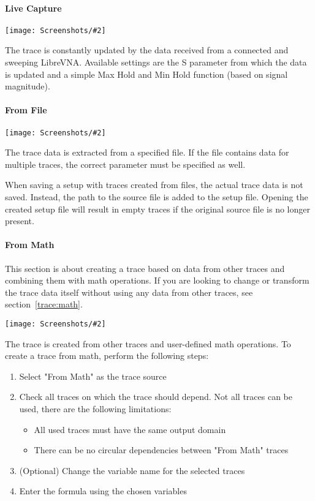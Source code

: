 \documentclass[a4paper,11pt]{article}
\newcommand\danger[1][5ex]{%
  \renewcommand\stacktype{L}%
  \scaleto{\stackon[1.3pt]{\color{red}$\triangle$}{\tiny !}}{#1}%
}
\newenvironment{important}[1][]{%
   \begin{mdframed}[%
      backgroundcolor={red!15}, hidealllines=true,
      skipabove=0.7\baselineskip, skipbelow=0.7\baselineskip,
      splitbottomskip=2pt, splittopskip=4pt, #1]%
   \makebox[0pt]{%
      \smash{%
         \hspace*{-45pt}%
         \raisebox{-5pt}{%
            {\danger}%
         }%
      }%
   }%
}{\end{mdframed}}
\newcommand\info[1][5ex]{%
  \renewcommand\stacktype{L}%
  \scaleto{\stackon[1.2pt]{\color{blue}$\bigcirc$}{\raisebox{-1.5pt}{\small i}}}{#1}%
}
\newenvironment{information}[1][]{%
   \begin{mdframed}[%
      backgroundcolor={blue!15}, hidealllines=true,
      skipabove=0.7\baselineskip, skipbelow=0.7\baselineskip,
      splitbottomskip=2pt, splittopskip=4pt, #1]%
   \makebox[0pt]{%
      \smash{%
         \hspace*{-45pt}%
         \raisebox{-5pt}{%
            {\info}%
         }%
      }%
   }%
}{\end{mdframed}}
\newcommand{\screenshot}[2]{\begin{center}
\texttt{[image: Screenshots/\#2]}
\end{center}}
\begin{document}
\paragraph{Live Capture}
\screenshot{0.5}{LiveCapture.png}
The trace is constantly updated by the data received from a connected and sweeping LibreVNA. Available settings are the S parameter from which the data is updated and a simple Max Hold and Min Hold function (based on signal magnitude).

\paragraph{From File}
\screenshot{0.5}{FromFile.png}
The trace data is extracted from a specified file. If the file contains data for multiple traces, the correct parameter must be specified as well.
\begin{important}
When saving a setup with traces created from files, the actual trace data is not saved. Instead, the path to the source file is added to the setup file. Opening the created setup file will result in empty traces if the original source file is no longer present.
\end{important}

\paragraph{From Math}
\label{trace:fromMath}
\begin{information}
This section is about creating a trace based on data from other traces and combining them with math operations. If you are looking to change or transform the trace data itself without using any data from other traces, see section~\ref{trace:math}.
\end{information}
\screenshot{0.5}{FromMath.png}
The trace is created from other traces and user-defined math operations. To create a trace from math, perform the following steps:
\begin{enumerate}
\item Select "From Math" as the trace source
\item Check all traces on which the trace should depend. Not all traces can be used, there are the following limitations:
\begin{itemize}
\item All used traces must have the same output domain
\item There can be no circular dependencies between "From Math" traces
\end{itemize}
\item (Optional) Change the variable name for the selected traces
\item Enter the formula using the chosen variables
\end{enumerate}
\end{document}
